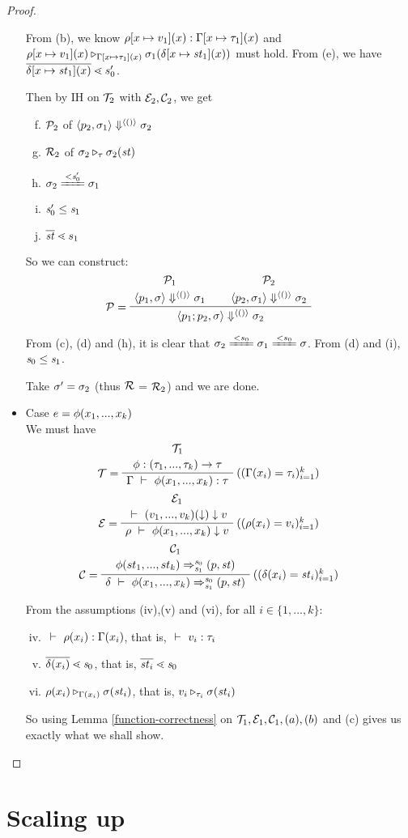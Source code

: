 \begin{proof}
\begin{itemize}
  From (b), we know $\rho[x \mapsto v_1](x) : \Gamma[x \mapsto \tau_1](x)$ and  $\rho[x \mapsto v_1](x) \triangleright_{\Gamma[x \mapsto \tau_1](x)} \sigma_1(\delta[x \mapsto \mathit{st}_1](x))$ must hold. 
  From (e), we have $\ol{\delta[\Map{x}{\st_1}](x)} \.< s_0'$. 
 
 Then by IH on  $\mathcal{T}_2$ with $\mathcal{E}_2,\mathcal{C}_2$, we get
 \begin{enumerate}	[(a)]
 	\setcounter{enumi}{5}
 	\item $\mathcal{P}_2$ of $\left\langle p_2,\sigma_1 \right\rangle \Downarrow^{\langle () \rangle} \sigma_2$ 
 	\item $\mathcal{R}_2$ of $ \sigma_2 \triangleright_{\tau} \sigma_2(\mathit{st})$
    \item $\sgm_2 \ConEq{\s_0'} \sgm_1$
    \item $\mathit{s}_0' \le \mathit{s}_1$
    \item $\ol{\st} \.< {s_1}$
\end{enumerate}

 So we can construct:  
 $$\PT{
 	\UCN{\MP_1}{\seval{p_1}{\sgm}{\vunit}{\sgm_1}}
 	\UCN{\MP_2}{\seval{p_2}{\sgm_1}{\vunit}{\sgm_2}}
 	\LeLa{\MP = }	
 	\BC{\seval{p_1;p_2}{\sgm}{\vunit}{\sgm_2}}
 }$$

 From (c), (d) and (h), it is clear that $\sgm_2 \ConEq{s_0} \sgm_1 \ConEq{s_0} \sgm$.
 From (d) and (i), $\mathit{s}_0 \le \mathit{s}_1$.
 
 Take $\sigma' = \sigma_2$ (thus $\mathcal{R}$ = $\mathcal{R}_2$)  and we are done. 
 
 
 \item Case $e = \phi(x_1,...,x_k)$ \\
 We must have  
 $$\PT{
 	\UCN{\MT_1}{\Typef {\hcall} {\replc{k}{\tau}} {\tau}}
 	\LeLa{\MT = }
 	\RiLa{((\Gam(x_i)= \tau_i)^k_{i=1})}
 	\UC{\Type{\Gam}{\hcall{\Tupk{x}}}{\tau}}
 }$$
 $$\PT{
 	\UCN{\ME_1}{\Eval{}{\EvalF{\Tupk{v}}}{v}}
 	\LeLa{\ME = }
 	\RiLa{((\rho(x_i)=v_i)^k_{i=1})}
 	\UC{\Eval{\rho}{\hcall{\Tupk{x}}}{v}}
 }$$
 $$\PT{
 	\UCN{\MC_1}{\Transf{\hcall}{\replc{k}{st}}{\s_0}{\s_1}{\sfun{p}{\st}}}
    \LeLa{\MC =}
 	\RiLa{((\del(x_i)=\st_i)^k_{i=1})}
 	\UC{\Trans{\del}{\hcall \Tupk{x}}{\s_0}{\s_1}{\sfun{p}{\st}}}
 }$$
 
 From the assumptions (iv),(v) and (vi), for all $i \in \{1,...,k\}$:
 \begin{enumerate}[(i)]
 	\setcounter{enumi}{3}
 	\item $\ \vdash\  \rho(x_i) : \Gamma(x_i)$, that is, $\ \vdash\  v_i : \tau_i$
 	\item $\ol{\del(x_i)} \.< \s_0$, that is, $\ol{\st_i} \.< \s_0$
 	\item $\rho(x_i) \triangleright_{\Gamma(x_i)} \sigma(\mathit{st}_i)$, that is,
 	$v_i \triangleright_{\tau_i} \sigma(\mathit{st}_i)$
 \end{enumerate}
 
 So using Lemma \ref{function-correctness} on $\mathcal{T}_1,\mathcal{E}_1, \mathcal{C}_1, (a),(b)$ and (c) gives us exactly what we shall show.
 	
	\end{itemize}	
\end{proof}


\section{Scaling up}
